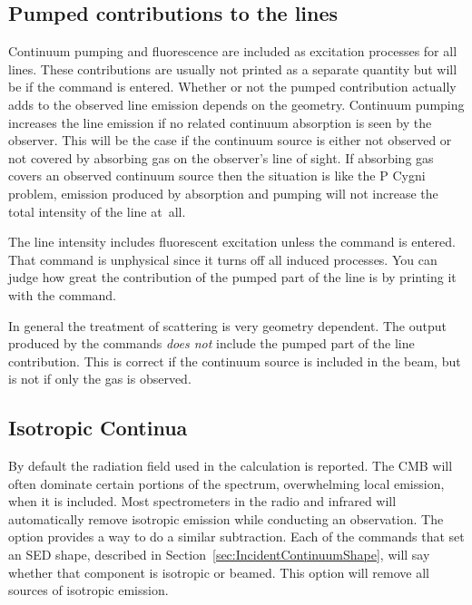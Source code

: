 \subsection{Pumped contributions to the lines}

Continuum pumping and fluorescence are included as excitation processes
for all lines.
These contributions are usually not printed as a separate
quantity but will be if the  command is entered.  Whether or not the pumped contribution actually
adds to the observed line emission depends on the geometry.
Continuum
pumping increases the line emission if no related continuum absorption is
seen by the observer.
This will be the case if the continuum source is
either not observed or not covered by absorbing gas on the observer's line
of sight.
If absorbing gas covers an observed continuum source then the
situation is like the P Cygni problem, emission produced by absorption
and pumping will not increase the total intensity of the line at~all.

The line intensity includes fluorescent excitation unless the
 command is entered.
That command is unphysical since it turns
off all induced processes.
You can judge how great the contribution of
the pumped part of the line is by printing it with the
 command.

In general the treatment of scattering is very geometry dependent.
The
output produced by the  commands \emph{does not} include the pumped
part of the line contribution.
This is correct if the continuum source
is included in the beam, but is not if only the gas is observed.

\subsection{Isotropic Continua}
\label{sec:save_cont_no_isotropic_option}

\par
By default the radiation field used in the calculation is reported. 
The CMB will often dominate certain portions of the spectrum,
overwhelming local emission, when it is included.
Most spectrometers in the radio and infrared will automatically remove  
isotropic emission while conducting an observation.
The  option provides a way to do a similar subtraction.
Each of the commands that set an SED shape,
described in Section~\ref{sec:IncidentContinuumShape}, will say
whether that component is isotropic or beamed.
This option will remove all sources of isotropic emission.

